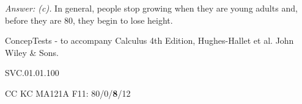{\it Answer: (c).} 
In general, people stop growing when they are young adults and, before they are 80, they begin to lose height.

\medskip
ConcepTests - to accompany Calculus 4th Edition, Hughes-Hallet et al. John Wiley \& Sons.

SVC.01.01.100



CC KC MA121A F11: 80/0/{\bf 8}/12  \\
